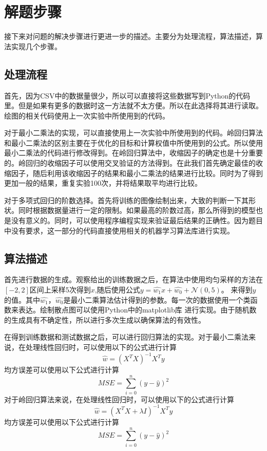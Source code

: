\documentclass[final]{cvpr}
\begin{document}
\section{解题步骤}
接下来对问题的解决步骤进行更进一步的描述。主要分为处理流程，算法描述，算法实现几个步骤。
\subsection{处理流程}
首先，因为CSV中的数据量很少，所以可以直接将这些数据写到Python的代码里。但是如果有更多的数据时这一方法就不太方便。所以在此选择将其进行读取。绘图的相关代码使用上一次实验中所使用到的代码。\par
对于最小二乘法的实现，可以直接使用上一次实验中所使用到的代码。岭回归算法和最小二乘法的区别主要在于优化的目标和计算权值中所使用到的公式。所以使用最小二乘法的代码进行修改得到。在岭回归算法中，收缩因子的确定也是十分重要的。岭回归的收缩因子可以使用交叉验证的方法得到。在此我们首先确定最佳的收缩因子，随后利用该收缩因子的结果和最小二乘法的结果进行比较。同时为了得到更加一般的结果，重复实验100次，并将结果取平均进行比较。\par
对于多项式回归的阶数选择。首先将训练的图像绘制出来，大致的判断一下其形状。同时根据数据量进行一定的限制。如果最高的阶数过高，那么所得到的模型也是没有意义的。同时，可以使用程序编程实现来验证最后结果的正确性。因为题目中没有要求，这一部分的代码直接使用相关的机器学习算法库进行实现。
\subsection{算法描述}
首先进行数据的生成。观察给出的训练数据之后，在算法中使用均匀采样的方法在$[-2,2]$区间上采样5次得到$x$,随后使用公式$y = \hat{w_{1}}x+\hat{w_{0}} + \mathcal{N}(0,5)$。
来得到$y$的值。其中$ \hat{w_{1}}， \hat{w_{0}}$是最小二乘算法估计得到的参数。每一次的数据使用一个类函数来表达。绘制散点图可以使用Python中的matplotlib库
进行实现。由于随机数的生成具有不确定性，所以进行多次生成以确保算法的有效性。\par
在得到训练数据和测试数据之后，可以进行回归算法的实现。对于最小二乘法来说，在处理线性回归时，可以使用以下的公式进行计算
\begin{equation}
    \hat{w} = (X^TX)^{-1}X^Ty
\end{equation}
均方误差可以使用以下公式进行计算
\begin{equation}
    MSE = \sum_{i=0}^{n}{(y-\hat{y})^2}
\end{equation}
对于岭回归算法来说，在处理线性回归时，可以使用以下的公式进行计算
\begin{equation}
    \hat{w} = (X^TX+\lambda I)^{-1}X^Ty
\end{equation}
均方误差可以使用以下公式进行计算
\begin{equation}
    MSE = \sum_{i=0}^{n}{(y-\hat{y})^2}
\end{equation}
\end{document}

